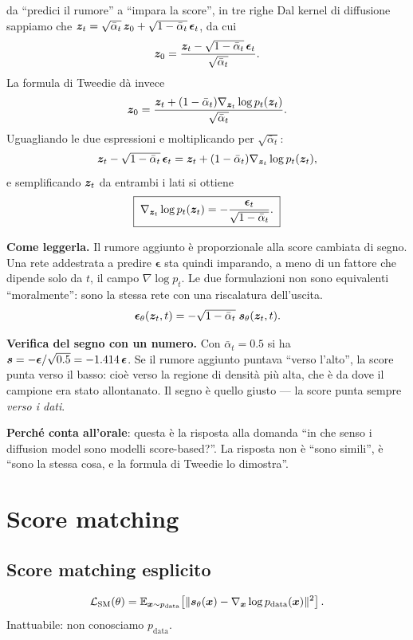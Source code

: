 \begin{esempiosvolto}{da ``predici il rumore'' a ``impara la score'', in tre righe}
Dal kernel di diffusione sappiamo che $\bm{z}_t = \sqrt{\bar\alpha_t}\,\bm{z}_0 + \sqrt{1-\bar\alpha_t}\,\boldsymbol{\epsilon}_t$, da cui
\[
\bm{z}_0 = \frac{\bm{z}_t - \sqrt{1-\bar\alpha_t}\,\boldsymbol{\epsilon}_t}{\sqrt{\bar\alpha_t}}.
\]
La formula di Tweedie dà invece
\[
\bm{z}_0 = \frac{\bm{z}_t + (1-\bar\alpha_t)\nabla_{\bm{z}_t}\log p_t(\bm{z}_t)}{\sqrt{\bar\alpha_t}}.
\]
Uguagliando le due espressioni e moltiplicando per $\sqrt{\bar\alpha_t}$:
\[
\bm{z}_t - \sqrt{1-\bar\alpha_t}\,\boldsymbol{\epsilon}_t = \bm{z}_t + (1-\bar\alpha_t)\nabla_{\bm{z}_t}\log p_t(\bm{z}_t),
\]
e semplificando $\bm{z}_t$ da entrambi i lati si ottiene
\[
\boxed{\;\nabla_{\bm{z}_t} \log p_t(\bm{z}_t) = -\frac{\boldsymbol{\epsilon}_t}{\sqrt{1-\bar\alpha_t}}.\;}
\]

\medskip
\textbf{Come leggerla.} Il rumore aggiunto è proporzionale alla score cambiata di segno. Una rete addestrata a predire $\boldsymbol{\epsilon}$ sta quindi imparando, a meno di un fattore che dipende solo da $t$, il campo $\nabla \log p_t$. Le due formulazioni non sono equivalenti ``moralmente'': sono la stessa rete con una riscalatura dell'uscita.
\[
\boldsymbol{\epsilon}_\theta(\bm{z}_t, t) = -\sqrt{1-\bar\alpha_t}\; \bm{s}_\theta(\bm{z}_t, t).
\]

\textbf{Verifica del segno con un numero.} Con $\bar\alpha_t = 0.5$ si ha $\bm{s} = -\boldsymbol{\epsilon}/\sqrt{0.5} = -1.414\,\boldsymbol{\epsilon}$. Se il rumore aggiunto puntava ``verso l'alto'', la score punta verso il basso: cioè verso la regione di densità più alta, che è da dove il campione era stato allontanato. Il segno è quello giusto — la score punta sempre \emph{verso i dati}.

\textbf{Perché conta all'orale}: questa è la risposta alla domanda ``in che senso i diffusion model sono modelli score-based?''. La risposta non è ``sono simili'', è ``sono la stessa cosa, e la formula di Tweedie lo dimostra''.
\end{esempiosvolto}

\section{Score matching}

\subsection{Score matching esplicito}
\[
\mathcal{L}_{\text{SM}}(\theta) = \mathbb{E}_{\bm{x}\sim p_{\text{data}}}\!\left[\| \bm{s}_\theta(\bm{x}) - \nabla_{\bm{x}}\log p_{\text{data}}(\bm{x}) \|^2\right].
\]
Inattuabile: non conosciamo $p_{\text{data}}$.

